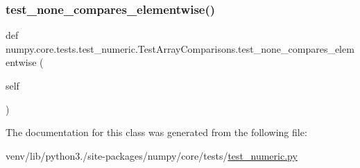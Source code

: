 \subsubsection{\texorpdfstring{test\+\_\+none\+\_\+compares\+\_\+elementwise()}{test\_none\_compares\_elementwise()}}
{\footnotesize\ttfamily def numpy.\+core.\+tests.\+test\+\_\+numeric.\+Test\+Array\+Comparisons.\+test\+\_\+none\+\_\+compares\+\_\+elementwise (\begin{DoxyParamCaption}\item[{}]{self }\end{DoxyParamCaption})}



The documentation for this class was generated from the following file\+:\begin{DoxyCompactItemize}
\item 
venv/lib/python3./site-\/packages/numpy/core/tests/\hyperlink{core_2tests_2test__numeric_8py}{test\+\_\+numeric.\+py}\end{DoxyCompactItemize}
